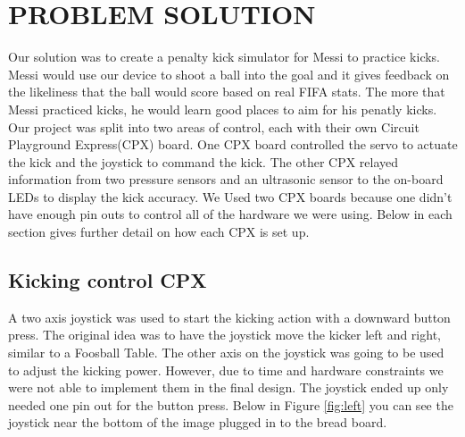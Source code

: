\documentclass[12pt]{article}
\begin{document}
\section{PROBLEM SOLUTION}%


Our solution was to create a penalty kick simulator for Messi to practice kicks. Messi would use our device to shoot a ball into the goal and it gives feedback on the likeliness that the ball would score based on real FIFA stats. The more that Messi practiced kicks, he would learn good places to aim for his penatly kicks. Our project was split into two areas of control, each with their own Circuit Playground Express(CPX) board. One CPX board controlled the servo to actuate the kick and the joystick to command the kick. The other CPX relayed information from two pressure sensors and an ultrasonic sensor to the on-board LEDs to display the kick accuracy. We Used two CPX boards because one didn't have enough pin outs to control all of the hardware we were using. Below in each section gives further detail on how each CPX is set up. 

\subsection{Kicking control CPX}

A two axis joystick was used to start the kicking action with a downward button press. The original idea was to have the joystick move the kicker left and right, similar to a Foosball Table. The other axis on the joystick was going to be used to adjust the kicking power. However, due to time and hardware constraints we were not able to implement them in the final design. The joystick ended up only needed one pin out for the button press. Below in Figure \ref{fig:left} you can see the joystick near the bottom of the image plugged in to the bread board. 
\end{document}
